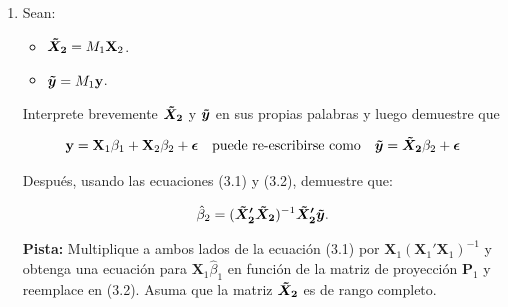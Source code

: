 \documentclass[a4paper, answers, addpoints, 11pt]{exam}
\newenvironment{solucion}{%
  \begin{mdframed}[
    backgroundcolor=blue!5,    %
    linecolor=blue!50,          %
    linewidth=2pt,              %
    leftmargin=10pt,            %
    rightmargin=8pt,           %
    topline=true,              %
    bottomline=true,            %
    roundcorner=10pt,           %
    innerleftmargin=10pt,       %
    innerrightmargin=10pt,      %
    innerbottommargin=10pt,     %
    innertopmargin=10pt         %
  ]%
  \begin{tcolorbox}[colframe=blue!50!black, colback=blue!50, coltitle=white, sharp corners=all, boxrule=1mm, width=\textwidth, halign=left, valign=center, top=0mm, bottom=0mm, left=0mm, right=0mm] \textbf{Solución} \end{tcolorbox} }{\end{mdframed}}
\begin{document}
\begin{enumerate}
\begin{enumerate}
\begin{solucion}
\begin{proof}
    \begin{align*}
        M_1\epsilon &= (I - P_1)\epsilon \\
        &= \epsilon - P_1\epsilon \qquad (\text{por exogeneidad débil}) \\
        &= \epsilon 
    \end{align*}
\end{proof}

\textbf{NOTA:}
Tenemos por supuesto del modelo de regresión lineal que las variables independientes no tienen información para predecir $\epsilon$, lo que llamamos \textbf{exogeneidad estricta}, que implica exogeneidad débil.
 
\end{solucion}
    \end{enumerate}

  

       
    \item Sean:
    
    \begin{itemize}\label{aniquiladoranotacion}
        \item $\boldsymbol{\Tilde{X}_2} =  M_1\textbf{X}_2$.
        \item $\boldsymbol{\Tilde{y}} =  M_1\textbf{y}$.
    \end{itemize}

    Interprete brevemente $\boldsymbol{\Tilde{X}_2}$ y $\boldsymbol{\Tilde{y}}$ en sus propias palabras y luego demuestre que

    \begin{equation}\label{eq:equiv}
        \textbf{y} = \textbf{X}_1\beta_1 + \textbf{X}_2\beta_2 + \boldsymbol\epsilon \quad \textrm{puede re-escribirse como} \quad \boldsymbol{\Tilde{y}} =\boldsymbol{\Tilde{X}_2}\beta_2 + \boldsymbol\epsilon
    \end{equation}

    \bigskip Después, usando las ecuaciones (3.1) y (3.2), demuestre que:
    
    \begin{equation}\label{eq:resid}
        \hat\beta_2 = (\boldsymbol{\Tilde{X}_2'}\boldsymbol{\Tilde{X}_2})^{-1}\boldsymbol{\Tilde{X}_2'}\boldsymbol{\Tilde{y}}.
    \end{equation}

    \textbf{Pista:} Multiplique a ambos lados de la ecuación (3.1) por $\textbf{X}_1(\textbf{X}_1'\textbf{X}_1)^{-1}$ y obtenga una ecuación para $\textbf{X}_1\hat\beta_1$ en función de la matriz de proyección $\textbf{P}_1$ y reemplace en (3.2). Asuma que la matriz $\boldsymbol{\Tilde{X}_2}$ es de rango completo. 


\end{enumerate}
\end{document}
